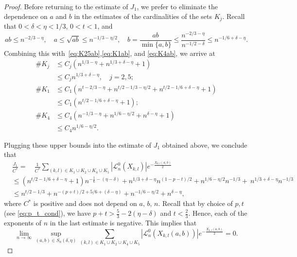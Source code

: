 \documentclass[11pt]{amsart}
\numberwithin{equation}{section}
\begin{document}
\begin{proof}
    Before returning to the estimate of $J_1$, we prefer to eliminate the dependence on $a$ and $b$ in the estimates of the cardinalities of the sets $K_j$. Recall that $0<\delta<\eta<1/3$, $0<t<1$, and 
    \begin{equation}\label{eq:ab_bounds_revisited}
        ab \leq n^{-2/3-\eta}, \quad a \leq \sqrt{ab} \leq n^{-1/3 - \eta/2}, \quad b = \frac{ab}{\min\{a,b\}} \leq \frac{n^{-2/3-\eta}}{n^{-1/2-\delta}} \leq n^{-1/6+\delta - \eta}.  
    \end{equation}
    Combining this with~\eqref{eq:K25ab},\eqref{eq:K1ab}, and \eqref{eq:K4ab}, we arrive at
     \begin{equation}\label{eq:K1245}
         \begin{split}
             \#K_j &\leq C_j(n^{1/3-\eta} +n^{1/3+\delta - \eta} +1)\\
             & \leq C_j n^{1/3+\delta-\eta}, \quad j=2,5;\\
             \#K_1 & \leq C_1(n^{t-2/3-\eta} + n^{t/2 - 1/3 - \eta/2}+n^{t/2-1/6+\delta-\eta}+1)\\
             & \leq C_1(n^{t/2-1/6+\delta-\eta}+1); \\
             \#K_4 & \leq C_4(n^{-1/3-\eta} + n^{1/6 - \eta/2}+n^{\delta-\eta}+1)\\
             & \leq C_4n^{1/6-\eta/2}
             .
         \end{split}
     \end{equation}
   
    Plugging these upper bounds into the estimate of $J_1$ obtained above, we conclude that
    \begin{align}
        &\frac{J_1}{C^*} = \quad \frac{1}{C^*} \sum_{(k,l)\in K_1\cup K_2\cup K_4\cup K_5}  |\mathcal{L}^{0}_n(X_{k,l})| e^{-\frac{X_{k,l}(a,b)}{2}}\\
        & \leq (n^{t/2-1/6+\delta-\eta}+1)  n^{-\frac{1}{6}-(\eta-\delta)}
        + n^{1/3+\delta-\eta} n^{(1-p-t)/2}
        + n^{1/6-\eta/2} n^{-1/3} + \ n^{1/3+\delta-\eta} n^{-1/3}\\
        & \leq n^{t/2-1/3}+n^{-(p+t)/2+5/6+(\delta-\eta)} + n^{-1/6-\eta/2} + n^{\delta-\eta},
    \end{align}
    where  $C^*$ is positive and does not depend on $a, \, b, \, n$. Recall that by choice of $p,t$ (see \eqref{eq:p_t_cond}), we have  $p+t>\tfrac{5}{3}-2(\eta-\delta)$ and $t<\tfrac{2}{3}$. Hence, each of the exponents of $n$ in the last estimate is negative. This implies that
    \begin{equation}
        \lim\limits_{n\to\infty} \sup\limits_{(a,b) \in S_n(\delta, \eta)}\sum_{(k,l)\in K_1\cup K_2\cup K_4\cup K_5}
        |\mathcal{L}^{0}_n(X_{k,l}(a,b))| e^{-\frac{X_{k,l}(a,b)}{2}} = 0.
    \end{equation}


\end{proof}
\end{document}
